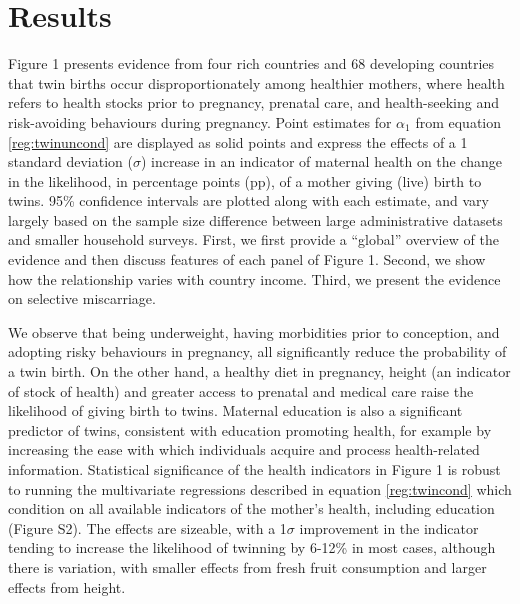 \documentclass[11pt]{article}
\begin{document}
\section*{Results}
Figure 1 presents evidence from four rich countries and 68 developing countries that twin births occur disproportionately among healthier mothers, where health refers to health stocks prior to pregnancy, prenatal care, and health-seeking and risk-avoiding behaviours during pregnancy. Point estimates for $\alpha_1$ from equation \ref{reg:twinuncond} are displayed as solid points and express the effects of a 1 standard deviation ($\sigma$) increase in an indicator of maternal health on the change in the likelihood, in percentage points (pp), of a mother giving (live) birth to twins. 95\% confidence intervals are plotted along with each estimate, and vary largely based on the sample size difference between large administrative datasets and smaller household surveys. First, we first provide a ``global'' overview of the evidence and then discuss features of each panel of Figure 1. Second, we show how the relationship varies with country income. Third, we present the evidence on selective miscarriage.

We observe that being underweight, having morbidities prior to conception, and adopting risky behaviours in pregnancy, all significantly reduce the probability of a twin birth. On the other hand, a healthy diet in pregnancy, height (an indicator of stock of health\cite{Silventoinen2003,BhalotraRawlings2013}) and greater access to prenatal and medical care raise the likelihood of giving birth to twins. Maternal education is also a significant predictor of twins, consistent with education promoting health, for example by increasing the ease with which individuals acquire and process health-related information\cite{Kenkel1991,CutlerLlerasMuney2010}. Statistical significance of the health indicators in Figure 1 is robust to running the multivariate regressions described in equation \ref{reg:twincond} which condition on all available indicators of the mother's health, including education (Figure S2). The effects are sizeable, with a 1$\sigma$ improvement in the indicator tending to increase the likelihood of twinning by 6-12\% in most cases, although there is variation, with smaller effects from fresh fruit consumption and larger effects from height.
\end{document}
